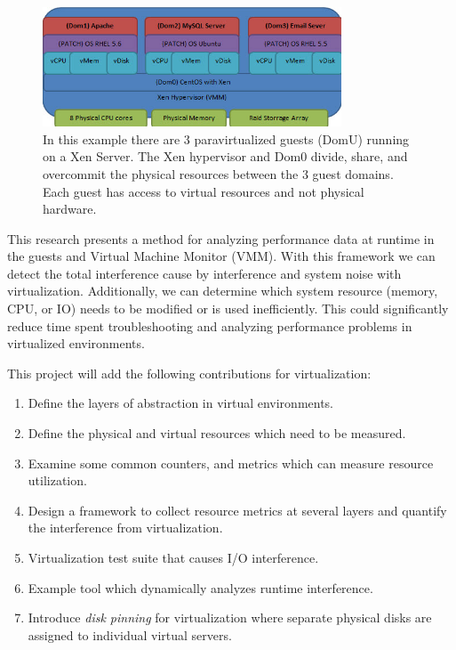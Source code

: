 \begin{figure}[!b]
  \begin{center}
    \includegraphics[width=3.5in]{images/VirtualizationExample.jpg}
  \end{center}
  \caption{\small In this example there are 3 paravirtualized guests (DomU) running on a Xen Server.  The Xen hypervisor and Dom0 divide, share, and overcommit the physical resources between the 3 guest domains.  Each guest has access to virtual resources and not physical hardware.}
  \label{virtStack}
\end{figure}

\indent This research presents a method for analyzing performance data at runtime in the guests and Virtual Machine Monitor (VMM).   With this framework we can detect the total interference cause by interference and system noise with virtualization.  Additionally, we can determine which system resource (memory, CPU, or IO) needs to be modified or is used inefficiently.  This could significantly reduce time spent troubleshooting and analyzing performance problems in virtualized environments.

\indent This project will add the following contributions for virtualization:
\begin{enumerate}
\item Define the layers of abstraction in virtual environments.
\item Define the physical and virtual resources which need to be measured.
\item Examine some common counters, and metrics which can measure resource utilization.
\item Design a framework to collect resource metrics at several layers and quantify the interference from virtualization.
\item Virtualization test suite that causes I/O interference.
\item Example tool which dynamically analyzes runtime interference.
\item Introduce \emph{disk pinning} for virtualization where separate physical disks are assigned to individual virtual servers.
\end{enumerate}

